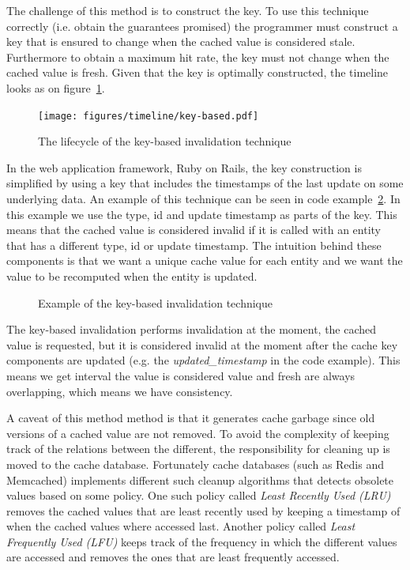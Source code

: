 The challenge of this method is to construct the key. To use this technique correctly (i.e. obtain the guarantees promised) the programmer must construct a key that is ensured to change when the cached value is considered stale. Furthermore to obtain a maximum hit rate, the key must not change when the cached value is fresh. Given that the key is optimally constructed, the timeline looks as on figure~\ref{fig:timeline:key-based}.

\begin{figure}[ht!]
  \centering
  \texttt{[image: figures/timeline/key-based.pdf]}
  \caption{The lifecycle of the key-based invalidation technique}
  \label{fig:timeline:key-based}
\end{figure}

In the web application framework, Ruby on Rails, the key construction is simplified by using a key that includes the timestamps of the last update on some underlying data. An example of this technique can be seen in code example~\ref{code:key-based-invalidation}. In this example we use the type, id and update timestamp as parts of the key. This means that the cached value is considered invalid if it is called with an entity that has a different type, id or update timestamp. The intuition behind these components is that we want a unique cache value for each entity and we want the value to be recomputed when the entity is updated.

\begin{figure}

\caption{Example of the key-based invalidation technique}
\label{code:key-based-invalidation}
\end{figure}

The key-based invalidation performs invalidation at the moment, the cached value is requested, but it is considered invalid at the moment after the cache key components are updated (e.g. the \emph{updated\_timestamp} in the code example). This means we get interval the value is considered value and fresh are always overlapping, which means we have consistency.

A caveat of this method method is that it generates cache garbage since old versions of a cached value are not removed. To avoid the complexity of keeping track of the relations between the different, the responsibility for cleaning up is moved to the cache database. Fortunately cache databases (such as Redis and Memcached) implements different such cleanup algorithms that detects obsolete values based on some policy. One such policy called \emph{Least Recently Used (LRU)} removes the cached values that are least recently used by keeping a timestamp of when the cached values where accessed last. Another policy called \emph{Least Frequently Used (LFU)} keeps track of the frequency in which the different values are accessed and removes the ones that are least frequently accessed.


